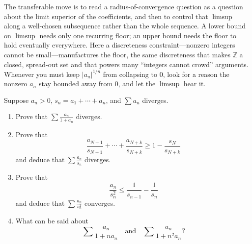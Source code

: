 \documentclass[main.tex]{subfiles}
\begin{document}
\begin{Reflection}
The transferable move is to read a radius-of-convergence question as a question about the limit
superior of the coefficients, and then to control that $\limsup$ along a well-chosen subsequence rather
than the whole sequence. A lower bound on $\limsup$ needs only one recurring floor; an upper bound needs
the floor to hold eventually everywhere. Here a discreteness constraint---nonzero integers cannot be
small---manufactures the floor, the same discreteness that makes $\mathbb Z$ a closed, spread-out set
and that powers many ``integers cannot crowd'' arguments. Whenever you must keep $|a_n|^{1/n}$ from
collapsing to $0$, look for a reason the nonzero $a_n$ stay bounded away from $0$, and let the $\limsup$
hear it.
\end{Reflection}

Suppose $a_{n} > 0$, $s_{n} = a_{1} + \cdots + a_{n}$, and $\sum a_{n}$ diverges.
\begin{enumerate}
  \item Prove that $\displaystyle\sum \frac{a_{n}}{1 + a_{n}}$ diverges.
  \item Prove that
  \[
  \frac{a_{N+1}}{s_{N+1}} + \cdots + \frac{a_{N+k}}{s_{N+k}} \geq 1 - \frac{s_{N}}{s_{N+k}}
  \]
  and deduce that $\displaystyle\sum \frac{a_{n}}{s_{n}}$ diverges.
  \item Prove that
  \[
  \frac{a_{n}}{s_{n}^{2}} \leq \frac{1}{s_{n-1}} - \frac{1}{s_{n}}
  \]
  and deduce that $\displaystyle\sum \frac{a_{n}}{s_{n}^{2}}$ converges.
  \item What can be said about
  \[
  \sum \frac{a_{n}}{1 + n a_{n}} \quad \text{and} \quad \sum \frac{a_{n}}{1 + n^{2} a_{n}}?
  \]
\end{enumerate}
\end{document}
